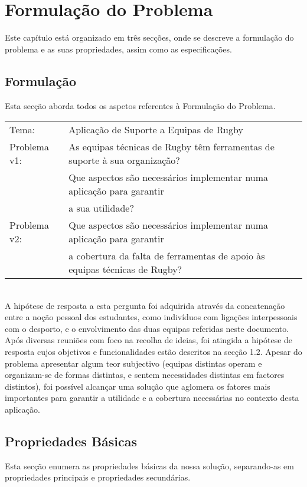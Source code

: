 %
%
\chapter{Formulação do Problema} \label{cap:formulacao}

Este capítulo está organizado em três secções, onde se descreve a formulação do problema e as suas propriedades, assim como as especificações.\\

\section{Formulação}\label{sec21}
Esta secção aborda todos os aspetos referentes à Formulação do Problema.\\

\begin{tabular}{ll}
	Tema: & Aplicação de Suporte a Equipas de Rugby \\
	Problema v1: & As equipas técnicas de Rugby têm ferramentas de suporte à sua organização? \\
		&	Que aspectos são necessários implementar numa aplicação para garantir \\
		&	a sua utilidade?\\
	Problema v2: & Que aspectos são necessários implementar numa aplicação para garantir \\
		&	a cobertura da falta de ferramentas de apoio às equipas técnicas de Rugby?\\
\end{tabular}\\[10mm]
A hipótese de resposta a esta pergunta foi adquirida através da concatenação entre a noção pessoal dos estudantes, como indivíduos com ligações interpessoais com o desporto, e o envolvimento das duas equipas referidas neste documento. Após diversas reuniões com foco na recolha de ideias, foi atingida a hipótese de resposta cujos objetivos e funcionalidades estão descritos na secção 1.2. Apesar do problema apresentar algum teor subjectivo (equipas distintas operam e organizam-se de formas distintas, e sentem necessidades distintas em factores distintos), foi possível alcançar uma solução que aglomera os fatores mais importantes para garantir a utilidade e a cobertura necessárias no contexto desta aplicação.

\section{Propriedades Básicas}\label{sec22}
Esta secção enumera as propriedades básicas da nossa solução, separando-as em propriedades principais e propriedades secundárias.

